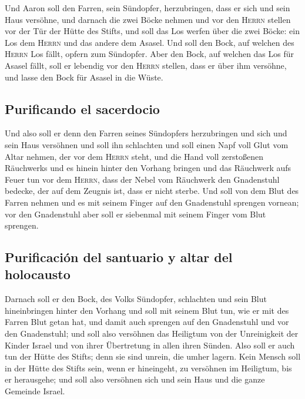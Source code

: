  Und Aaron soll den Farren, sein Sündopfer, herzubringen,
dass er sich und sein Haus versöhne,  und darnach die zwei
Böcke nehmen und vor den \textsc{Herrn} stellen vor der Tür der Hütte
des Stifts,  und soll das Los werfen über die zwei Böcke:
ein Los dem \textsc{Herrn} und das andere dem Asasel.  Und
soll den Bock, auf welchen des \textsc{Herrn} Los fällt, opfern zum
Sündopfer.  Aber den Bock, auf welchen das Los für Asasel
fällt, soll er lebendig vor den \textsc{Herrn} stellen, dass er über ihm
versöhne, und lasse den Bock für Asasel in die Wüste.

\hypertarget{purificando-el-sacerdocio}{%
\subsection{Purificando el sacerdocio}\label{purificando-el-sacerdocio}}

 Und also soll er denn den Farren seines Sündopfers
herzubringen und sich und sein Haus versöhnen und soll ihn schlachten
 und soll einen Napf voll Glut vom Altar nehmen, der vor
dem \textsc{Herrn} steht, und die Hand voll zerstoßenen Räuchwerks und
es hinein hinter den Vorhang bringen  und das Räuchwerk
aufs Feuer tun vor dem \textsc{Herrn}, dass der Nebel vom Räuchwerk den
Gnadenstuhl bedecke, der auf dem Zeugnis ist, dass er nicht sterbe.
 Und soll von dem Blut des Farren nehmen und es mit
seinem Finger auf den Gnadenstuhl sprengen vornean; vor den Gnadenstuhl
aber soll er siebenmal mit seinem Finger vom Blut sprengen.

\hypertarget{purificaciuxf3n-del-santuario-y-altar-del-holocausto}{%
\subsection{Purificación del santuario y altar del
holocausto}\label{purificaciuxf3n-del-santuario-y-altar-del-holocausto}}

 Darnach soll er den Bock, des Volks Sündopfer,
schlachten und sein Blut hineinbringen hinter den Vorhang und soll mit
seinem Blut tun, wie er mit des Farren Blut getan hat, und damit auch
sprengen auf den Gnadenstuhl und vor den Gnadenstuhl; 
und soll also versöhnen das Heiligtum von der Unreinigkeit der Kinder
Israel und von ihrer Übertretung in allen ihren Sünden. Also soll er
auch tun der Hütte des Stifts; denn sie sind unrein, die umher lagern.
 Kein Mensch soll in der Hütte des Stifts sein, wenn er
hineingeht, zu versöhnen im Heiligtum, bis er herausgehe; und soll also
versöhnen sich und sein Haus und die ganze Gemeinde Israel.

